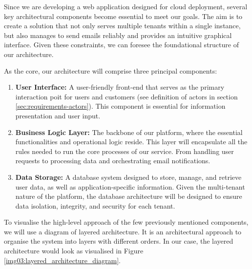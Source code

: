 Since we are developing a web application designed for cloud deployment, several key architectural components become essential to meet our goals.
The aim is to create a solution that not only serves multiple tenants within a single instance, but also manages to send emails reliably and provides an intuitive graphical interface.
Given these constraints, we can foresee the foundational structure of our architecture.

As the core, our architecture will comprise three principal components:
\begin{enumerate}
    \item \textbf{User Interface:} A user-friendly front-end that serves as the primary interaction poit for users and customers (see definition of actors in section \ref{sec:requirements-actors}). This component is essential for information presentation and user input.
    \item \textbf{Business Logic Layer:} The backbone of our platform, where the essential functionalities and operational logic reside. This layer will encapsulate all the rules needed to run the core processes of our service. From handling user requests to processing data and orchestrating email notifications.
    \item \textbf{Data Storage:} A database system designed to store, manage, and retrieve user data, as well as application-specific information. Given the multi-tenant nature of the platform, the database architecture will be designed to ensure data isolation, integrity, and security for each tenant.
\end{enumerate}

To visualise the high-level approach of the few previously mentioned components, we will use a diagram of layered architecture. 
It is an architectural approach to organise the system into layers with different orders. 
In our case, the layered architecture would look as visualised in Figure \ref{img03:layered_architecture_diagram}.

